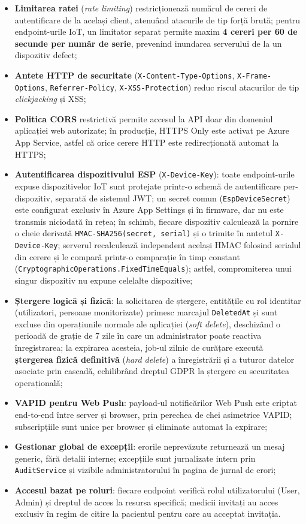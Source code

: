 \documentclass[12pt,a4paper,twoside]{article}
\begin{document}
\begin{itemize}[leftmargin=1.5em]
\item \textbf{Limitarea ratei} (\textit{rate limiting}) restricționează numărul de cereri de autentificare de la același client, atenuând atacurile de tip forță brută; pentru endpoint-urile IoT, un limitator separat permite maxim \textbf{4 cereri per 60 de secunde per număr de serie}, prevenind inundarea serverului de la un dispozitiv defect;
\item \textbf{Antete HTTP de securitate} (\texttt{X-Content-Type-Options}, \texttt{X-Frame-Options}, \texttt{Referrer-Policy}, \texttt{X-XSS-Protection}) reduc riscul atacurilor de tip \textit{clickjacking} și XSS;
\item \textbf{Politica CORS} restrictivă permite accesul la API doar din domeniul aplicației web autorizate; în producție, HTTPS Only este activat pe Azure App Service, astfel că orice cerere HTTP este redirecționată automat la HTTPS;
\item \textbf{Autentificarea dispozitivului ESP} (\texttt{X-Device-Key}): toate endpoint-urile expuse dispozitivelor IoT sunt protejate printr-o schemă de autentificare per-dispozitiv, separată de sistemul JWT; un secret comun (\texttt{EspDeviceSecret}) este configurat exclusiv în Azure App Settings și în firmware, dar nu este transmis niciodată în rețea; în schimb, fiecare dispozitiv calculează la pornire o cheie derivată \texttt{HMAC-SHA256(secret,\,serial)} și o trimite în antetul \texttt{X-Device-Key}; serverul recalculează independent același HMAC folosind serialul din cerere și le compară printr-o comparație în timp constant (\texttt{CryptographicOperations.FixedTimeEquals}); astfel, compromiterea unui singur dispozitiv nu expune celelalte dispozitive;
\item \textbf{Ștergere logică și fizică}: la solicitarea de ștergere, entitățile cu rol identitar (utilizatori, persoane monitorizate) primesc marcajul \texttt{DeletedAt} și sunt excluse din operațiunile normale ale aplicației (\textit{soft delete}), deschizând o perioadă de grație de 7 zile în care un administrator poate reactiva înregistrarea; la expirarea acesteia, job-ul zilnic de curățare execută \textbf{ștergerea fizică definitivă} (\textit{hard delete}) a înregistrării și a tuturor datelor asociate prin cascadă, echilibrând dreptul GDPR la ștergere cu securitatea operațională;
\item \textbf{VAPID pentru Web Push}: payload-ul notificărilor Web Push este criptat end-to-end între server și browser, prin perechea de chei asimetrice VAPID; subscripțiile sunt unice per browser și eliminate automat la expirare;
\item \textbf{Gestionar global de excepții}: erorile neprevăzute returnează un mesaj generic, fără detalii interne; excepțiile sunt jurnalizate intern prin \texttt{AuditService} și vizibile administratorului în pagina de jurnal de erori;
\item \textbf{Accesul bazat pe roluri}: fiecare endpoint verifică rolul utilizatorului (User, Admin) și dreptul de acces la resursa specifică; medicii invitați au acces exclusiv în regim de citire la pacientul pentru care au acceptat invitația.
\end{itemize}
\end{document}
